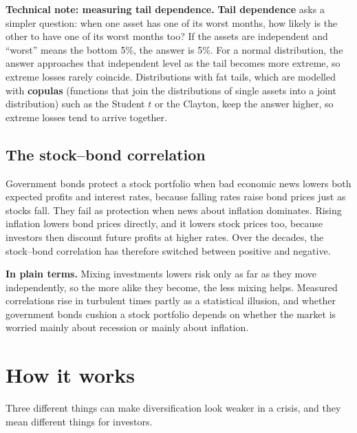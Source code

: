 \begin{technote}
\textbf{Technical note: measuring tail dependence.} \textbf{Tail dependence} asks a simpler question: when one asset has one of its worst months, how likely is the other to have one of its worst months too? If the assets are independent and ``worst'' means the bottom 5\%, the answer is 5\%. For a normal distribution, the answer approaches that independent level as the tail becomes more extreme, so extreme losses rarely coincide. Distributions with fat tails, which are modelled with \textbf{copulas} (functions that join the distributions of single assets into a joint distribution) such as the Student $t$ or the Clayton, keep the answer higher, so extreme losses tend to arrive together.
\end{technote}

\subsection{The stock--bond correlation}

Government bonds protect a stock portfolio when bad economic news lowers both expected profits and interest rates, because falling rates raise bond prices just as stocks fall. They fail as protection when news about inflation dominates. Rising inflation lowers bond prices directly, and it lowers stock prices too, because investors then discount future profits at higher rates. Over the decades, the stock--bond correlation has therefore switched between positive and negative.

\noindent\textbf{In plain terms.} Mixing investments lowers risk only as far as they move independently, so the more alike they become, the less mixing helps. Measured correlations rise in turbulent times partly as a statistical illusion, and whether government bonds cushion a stock portfolio depends on whether the market is worried mainly about recession or mainly about inflation.

\section{How it works}
\label{sec:13-how}

Three different things can make diversification look weaker in a crisis, and they mean different things for investors.

